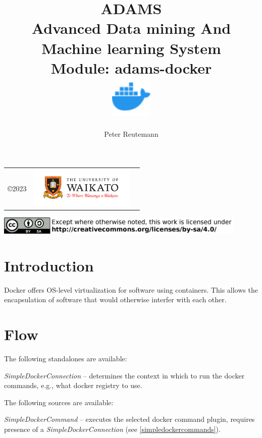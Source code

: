 \documentclass[a4paper]{book}
\title{
  \textbf{ADAMS} \\
  {\Large \textbf{A}dvanced \textbf{D}ata mining \textbf{A}nd \textbf{M}achine
  learning \textbf{S}ystem} \\
  {\Large Module: adams-docker} \\
  \vspace{1cm}
  \includegraphics[width=2cm]{images/docker-module.png} \\
}
\author{
  Peter Reutemann
}
\begin{document}
\begin{titlepage}
\maketitle

\thispagestyle{empty}
\center
\begin{table}[b]
	\begin{tabular}{c l l}
		\parbox[c][2cm]{2cm}{\copyright 2023} &
		\parbox[c][2cm]{5cm}{\includegraphics[width=5cm]{images/coat_of_arms.pdf}} \\
	\end{tabular}
	\includegraphics[width=12cm]{images/cc.png} \\
\end{table}

\end{titlepage}

\tableofcontents
\listoffigures

\chapter{Introduction}
Docker\cite{docker} offers OS-level virtualization for software using containers.
This allows the encapsulation of software that would otherwise interfer with each
other.

\chapter{Flow}
The following standalones are available:
\begin{tight_itemize}
  \item \textit{SimpleDockerConnection} -- determines the context in which to run the docker commands, e.g., what docker registry to use.
\end{tight_itemize}

\noindent The following sources are available:
\begin{tight_itemize}
  \item \textit{SimpleDockerCommand} -- executes the selected docker command plugin, requires presence of a
  \textit{SimpleDockerConnection} (see \ref{simpledockercommands}).
\end{tight_itemize}
\end{document}
